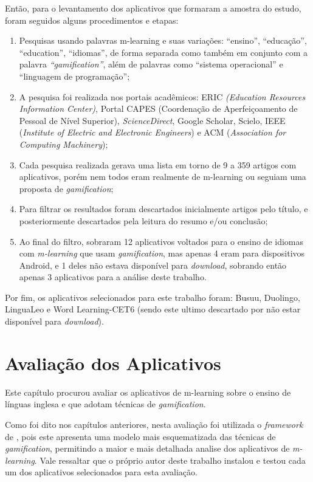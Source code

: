 \documentclass[
	12pt,				%
	openany,			%
	oneside,			%
	a4paper,			%
	english,			%
	french,				%
	spanish,			%
	brazil				%
	]{abntex2}
\begin{document}
	Então, para o levantamento dos aplicativos que formaram a amostra do estudo, foram seguidos alguns procedimentos e etapas:
\begin{enumerate}
\item Pesquisas usando palavras m-learning e suas variações: “ensino”, “educação”, “education”, “idiomas”, de forma separada como também em conjunto com a palavra \textit{“gamification”}, além de palavras como “sistema operacional” e “linguagem de programação”;
\item A pesquisa foi realizada nos portais acadêmicos: ERIC \textit{(Education Resources Information Center)}, Portal CAPES (Coordenação de Aperfeiçoamento de Pessoal de Nível Superior), \textit{ScienceDirect}, Google Scholar, Scielo, IEEE (\textit{Institute of Electric and Electronic Engineers}) e ACM (\textit{Association for Computing Machinery});
\item Cada pesquisa realizada gerava uma lista em torno de 9 a 359 artigos com aplicativos, porém nem todos eram realmente de m-learning ou seguiam uma proposta de \textit{gamification};
\item Para filtrar os resultados foram descartados inicialmente artigos pelo título, e posteriormente descartados pela leitura do resumo e/ou conclusão;
\item Ao final do filtro, sobraram 12 aplicativos voltados para o ensino de idiomas com \textit{m-learning} que usam \textit{gamification}, mas apenas 4 eram para dispositivos Android, e 1 deles não estava disponível para \textit{download}, sobrando então apenas 3 aplicativos para a análise deste trabalho.
\end{enumerate}

Por fim, os aplicativos selecionados para este trabalho foram: Busuu, Duolingo, LinguaLeo e Word Learning-CET6 (sendo este ultimo descartado por não estar disponível para \textit{download}).







\chapter{Avaliação dos Aplicativos}
Este capítulo procurou avaliar os aplicativos de m-learning sobre o ensino de línguas inglesa e que adotam técnicas de \textit{gamification}.

Como foi dito nos capítulos anteriores, nesta avaliação foi utilizada o \textit{framework} de , pois este apresenta uma modelo mais esquematizada das técnicas de \textit{gamification}, permitindo a maior e mais detalhada analise dos aplicativos de \textit{m-learning}. Vale ressaltar que o próprio autor deste trabalho instalou e testou cada um dos aplicativos selecionados para esta avaliação.
\end{document}
